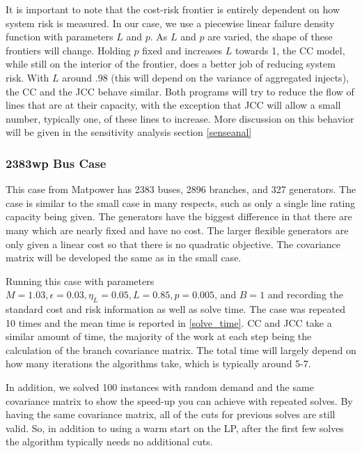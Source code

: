 It is important to note that the cost-risk frontier is entirely dependent on how system risk is measured.  In our case, we use a piecewise linear failure density function with parameters $L$ and $p$.  As $L$ and $p$ are varied, the shape of these frontiers will change.  Holding $p$ fixed and increases $L$ towards 1, the CC model, while still on the interior of the frontier, does a better job of reducing system risk.  With $L$ around .98 (this will depend on the variance of aggregated injects), the CC and the JCC behave similar.  Both programs will try to reduce the flow of lines that are at their capacity, with the exception that JCC will allow a small number, typically one, of these lines to increase.  More discussion on this behavior will be given in the sensitivity analysis section \ref{senseanal}


\subsubsection*{2383wp Bus Case}
This case from Matpower has 2383 buses, 2896 branches, and 327 generators.  The case is similar to the small case in many respects, such as only a single line rating capacity being given.  The generators have the biggest difference in that there are many which are nearly fixed and have no cost.  The larger flexible generators are only given a linear cost so that there is no quadratic objective.  The covariance matrix will be developed the same as in the small case.

Running this case with parameters $M=1.03, \epsilon=0.03, \eta_L=0.05, L=0.85, p=0.005$, and $B=1$ and recording the standard cost and risk information as well as solve time.  The case was repeated 10 times and the mean time is reported in \ref{solve_time}.  CC and JCC take a similar amount of time, the majority of the work at each step being the calculation of the branch covariance matrix.  The total time will largely depend on how many iterations the algorithms take, which is typically around 5-7. 

In addition, we solved 100 instances with random demand and the same covariance matrix to show the speed-up you can achieve with repeated solves.  By having the same covariance matrix, all of the cuts for previous solves are still valid.  So, in addition to using a warm start on the LP, after the first few solves the algorithm typically needs no additional cuts.

